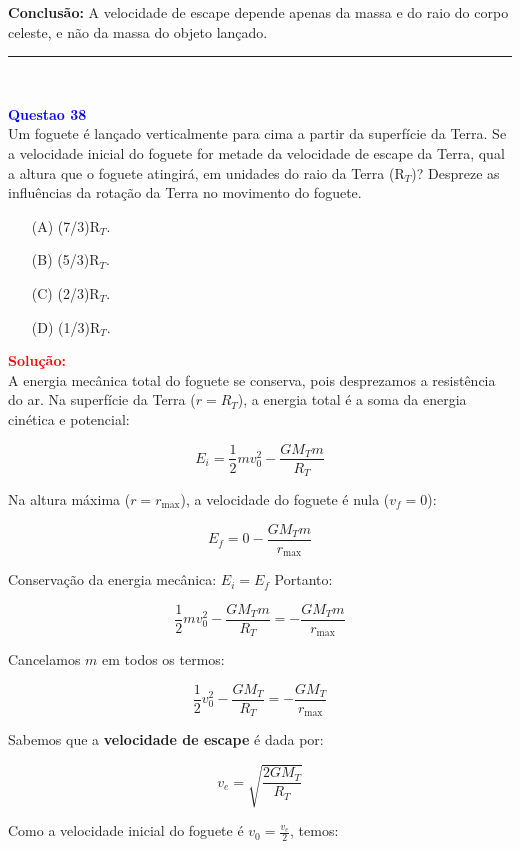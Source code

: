 \documentclass[a4paper,12pt]{article}
\begin{document}
\noindent
\textbf{Conclusão:} A velocidade de escape depende apenas da massa e do raio do corpo celeste, e não da massa do objeto lançado.

\noindent\rule{\linewidth}{0.6pt}\\

\begin{flushleft}
\textbf{\textcolor{blue}{\Large Questao 38}}\\
\noindent
Um foguete é lançado verticalmente para cima a partir da
superfície da Terra. Se a velocidade inicial do foguete for
metade da velocidade de escape da Terra, qual a altura que
o foguete atingirá, em unidades do raio da Terra (R$_{T}$)?
Despreze as influências da rotação da Terra no movimento
do foguete.

\begin{itemize}
\item[(A)] (7/3)R$_{T}$.
\item[(B)] (5/3)R$_{T}$.
\item[(C)] (2/3)R$_{T}$.
\item[(D)] (1/3)R$_{T}$.
\end{itemize}

\vspace{0.5cm}

\textcolor{red}{\textbf{Solução:}}\\

A energia mecânica total do foguete se conserva, pois desprezamos a resistência do ar.  
Na superfície da Terra (\(r = R_T\)), a energia total é a soma da energia cinética e potencial:  

\[
E_i = \frac{1}{2} m v_0^2 - \frac{G M_T m}{R_T}
\]

Na altura máxima (\(r = r_{\text{max}}\)), a velocidade do foguete é nula (\(v_f = 0\)):  

\[
E_f = 0 - \frac{G M_T m}{r_{\text{max}}}
\]

Conservação da energia mecânica: \(E_i = E_f\)  
Portanto:

\[
\frac{1}{2} m v_0^2 - \frac{G M_T m}{R_T} = - \frac{G M_T m}{r_{\text{max}}}
\]

Cancelamos \(m\) em todos os termos:

\[
\frac{1}{2} v_0^2 - \frac{G M_T}{R_T} = - \frac{G M_T}{r_{\text{max}}}
\]

Sabemos que a \textbf{velocidade de escape} é dada por:

\[
v_e = \sqrt{\frac{2 G M_T}{R_T}}
\]

Como a velocidade inicial do foguete é \(v_0 = \frac{v_e}{2}\), temos:


\end{flushleft}
\end{document}
